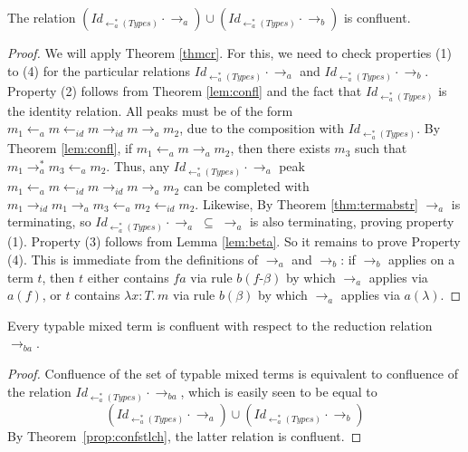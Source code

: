 \documentclass{LMCS}
\newcommand{\subse}{\; \subseteq \;}
\begin{document}
\begin{thm}
\label{prop:confstlch}
The relation $(\textit{Id}_{\leftarrow_a^*(\textit{Types})}
\cdot \to_a)\cup(\textit{Id}_{\leftarrow_a^*(\textit{Types})}
\cdot \to_b)$ is confluent.
\end{thm}
\begin{proof}
We will apply Theorem \ref{thmcr}.  For this, we need to check
properties (1) to (4) for the particular relations
$\textit{Id}_{\leftarrow_a^*(\textit{Types})} \cdot \to_a$ and
$\textit{Id}_{\leftarrow_a^*(\textit{Types})} \cdot \to_b$. Property
(2) follows from Theorem \ref{lem:confl} and the fact that
$\textit{Id}_{\leftarrow_a^*(\textit{Types})}$ is the identity
relation. All peaks must be of the form $m_1 \leftarrow_a m
\leftarrow_{id} m \to_{id} m \to_a m_2$, due to the composition with
$\textit{Id}_{\leftarrow_a^*(\textit{Types})}$. By Theorem
\ref{lem:confl}, if $m_1 \leftarrow_a m \to_a m_2$, then there exists
$m_3$ such that $m_1 \to_a^* m_3 \leftarrow_a m_2$. Thus, any
$\textit{Id}_{\leftarrow_a^*(\textit{Types})} \cdot \to_a$ peak $m_1
\leftarrow_a m \leftarrow_{id} m \to_{id} m \to_a m_2$ can be
completed with $m_1 \to_{id} m_1 \to_a m_3 \leftarrow_a m_2
\leftarrow_{id} m_2$. Likewise, By Theorem \ref{thm:termabstr} $\to_a$
is terminating, so $\textit{Id}_{\leftarrow_a^*(\textit{Types})} \cdot
\to_a \subse \to_a$ is also terminating, proving property (1). Property (3) follows from
Lemma \ref{lem:beta}. So it remains to prove Property (4). This is
immediate from the definitions of $\to_a$ and $\to_b$: if $\to_b$
applies on a term $t$, then $t$ either contains $f a$ via rule
$\textit{b}(\textit{f-}\beta)$ by which $\to_a$ applies via $a(f)$, or
$t$ contains $\lambda x:T.\, m$ via rule $\textit{b}(\beta)$ by which
$\to_a$ applies via $a(\lambda)$. 
\end{proof}

\begin{cor}
\label{prop:confstlc}
Every typable mixed term is confluent with respect to the reduction
relation $\to_{ba}$.
\end{cor}
\begin{proof} Confluence of the set of typable mixed terms is equivalent
to confluence of  the relation $\textit{Id}_{\leftarrow_a^*(\textit{Types})} \cdot \to_{ba}$,
which is easily seen to be equal to
\[
(\textit{Id}_{\leftarrow_a^*(\textit{Types})}
\cdot \to_a)\cup(\textit{Id}_{\leftarrow_a^*(\textit{Types})}
\cdot \to_b)
\]
\noindent By Theorem~\ref{prop:confstlch}, the latter relation is confluent.
\end{proof}
\end{document}
